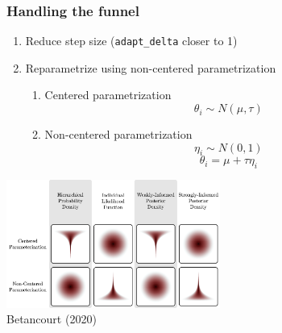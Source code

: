\documentclass[10pt]{beamer}
\begin{document}
\begin{frame}
\frametitle{Handling the funnel}

  \begin{enumerate}
  \item Reduce step size (\texttt{adapt\_delta} closer to 1)
  \item Reparametrize using non-centered parametrization
  \begin{enumerate}
  \item Centered parametrization
  \[
  \theta_i \sim N(\mu, \tau)
  \]
  \pause
  \vspace{-3mm}
  \item Non-centered parametrization
  \[
  \eta_i \sim N(0, 1)
  \]
  \[
  \theta_i = \mu + \tau \eta_i
  \]
  \end{enumerate}
  \end{enumerate}
  \vspace{0mm}
  \center
  {\includegraphics[width=7cm]{figs/centered_noncentered.png}}\\
  \tiny{Betancourt (2020)}



\end{frame}
\end{document}
